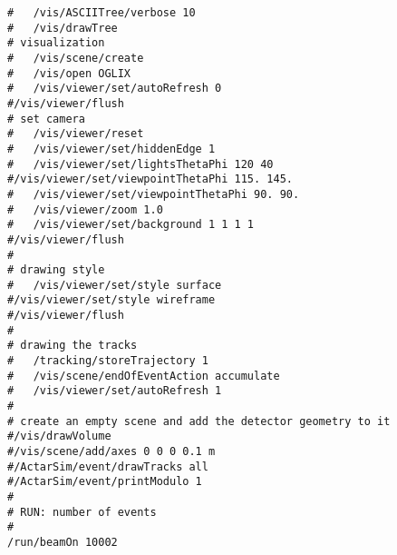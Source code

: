 \begin{verbatim}
#   /vis/ASCIITree/verbose 10
#   /vis/drawTree
# visualization
#   /vis/scene/create
#   /vis/open OGLIX
#   /vis/viewer/set/autoRefresh 0
#/vis/viewer/flush
# set camera
#   /vis/viewer/reset
#   /vis/viewer/set/hiddenEdge 1
#   /vis/viewer/set/lightsThetaPhi 120 40
#/vis/viewer/set/viewpointThetaPhi 115. 145.
#   /vis/viewer/set/viewpointThetaPhi 90. 90.
#   /vis/viewer/zoom 1.0
#   /vis/viewer/set/background 1 1 1 1
#/vis/viewer/flush
#
# drawing style
#   /vis/viewer/set/style surface
#/vis/viewer/set/style wireframe
#/vis/viewer/flush
#
# drawing the tracks
#   /tracking/storeTrajectory 1
#   /vis/scene/endOfEventAction accumulate
#   /vis/viewer/set/autoRefresh 1
#
# create an empty scene and add the detector geometry to it
#/vis/drawVolume
#/vis/scene/add/axes 0 0 0 0.1 m
#/ActarSim/event/drawTracks all
#/ActarSim/event/printModulo 1
#
# RUN: number of events
#
/run/beamOn 10002
\end{verbatim}

